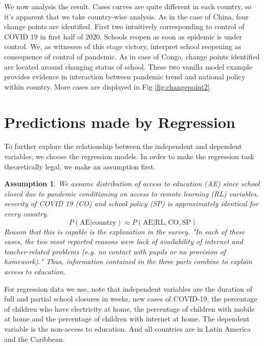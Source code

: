 \documentclass{article}
\newtheorem{assump}{Assumption}
\begin{document}
We now analysis the result. Cases curves are quite different in each country, so it's apparent that we take country-wise analysis. As in the case of China, four change points are identified. First two intuitively corresponding to control of COVID 19 in first half of 2020. Schools reopen as soon as epidemic is under control. We, as witnesses of this stage victory, interpret school reopening as consequence of control of pandemic. As in case of Congo, change points identified are located around changing status of school. These two vanilla model example provides evidence in interaction between pandemic trend and national policy within country. More cases are displayed in Fig \ref{fig:changepoint2}.

\section{Predictions made by Regression}
\label{prediction}
To further explore the relationship between the independent and dependent variables, we choose the regression models. In order to make the regression task theoretically legal, we make an assumption first.
\begin{assump}
We assume distribution of access to education (AE) since school closed due to pandemic conditioning on access to remote learning (RL) variables, severity of COVID 19 (CO) and school policy (SP) is approximately identical for every country. 
$$
P( \text{AE}|\text{country})\approx P(\text{AE}| \text{RL}, \text{CO}, \text{SP})
$$
Reason that this is capable is the explanation in the survey. "In each of these cases, the two most reported reasons were lack of availability of internet and teacher-related problems (e.g. no contact with pupils or no provision of homework)." Thus, information contained in the three parts combine to explain access to education. 
\end{assump}


For regression data we use, note that independent variables are the duration of full and partial school closures in weeks, new cases of COVID-19, the percentage of children who have electricity at home, the percentage of children with mobile at home and the percentage of children with internet at home. The dependent variable is the non-access to education. And all countries are in Latin America and the Caribbean.
\end{document}
